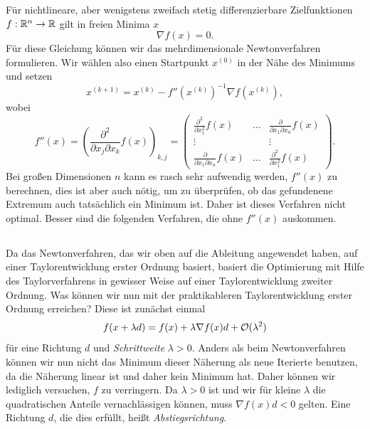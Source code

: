 Für nichtlineare, aber wenigstens zweifach stetig differenzierbare
Zielfunktionen $f:\mathbb{R}^n\to \mathbb{R}$ gilt in freien Minima $x$
\begin{equation}
  \nabla f(x) = 0.
\end{equation}
Für diese Gleichung können wir das mehrdimensionale Newtonverfahren
formulieren. Wir wählen also einen Startpunkt $x^{(0)}$ in der Nähe
des Minimums und setzen
\begin{equation}
  x^{(k+1)} = x^{(k)} - f''\left(x^{(k)}\right)^{-1}\nabla f\left(x^{(k)}\right),
\end{equation}
wobei
\begin{equation}
  f''(x) = 
  \left(\frac{\partial^2}{\partial x_j\partial x_k}f(x)\right)_{k,j} = 
  \begin{pmatrix}
    \frac{\partial^2}{\partial x_1^2}f(x) & \ldots &
    \frac{\partial}{\partial x_1\partial x_n}f(x)\\
    \vdots               &        & \vdots \\
    \frac{\partial}{\partial x_1\partial x_n}f(x) & \ldots &
    \frac{\partial^2}{\partial x_1^2}f(x)
  \end{pmatrix}.
\end{equation}
Bei großen Dimensionen $n$ kann es rasch sehr aufwendig werden,
$f''(x)$ zu berechnen, dies ist aber auch nötig, um zu überprüfen,
ob das gefundenene Extremum auch tatsächlich ein Minimum ist. Daher
ist dieses Verfahren nicht optimal. Besser sind die folgenden
Verfahren, die ohne $f''(x)$ auskommen.

\subsection{}

Da das Newtonverfahren, das wir oben auf die Ableitung angewendet
haben, auf einer Taylorentwicklung erster Ordnung
basiert, basiert die Optimierung mit Hilfe des Taylorverfahrens in
gewisser Weise auf einer Taylorentwicklung zweiter Ordnung. Was können
wir nun mit der praktikableren Taylorentwicklung erster Ordnung
erreichen? Diese ist zunächst einmal
\begin{equation}
  \label{eq:steepestdescentexpand}
  f(x + \lambda d) = f(x) + \lambda \nabla f(x)d + \mathcal O(\lambda^2)
\end{equation}
für eine Richtung $d$ und \emph{Schrittweite} $\lambda > 0$.  Anders
als beim Newtonverfahren können wir nun nicht das Minimum dieser
Näherung als neue Iterierte benutzen, da die Näherung linear ist und
daher kein Minimum hat. Daher können wir lediglich versuchen, $f$ zu
verringern. Da $\lambda>0$ ist und wir für kleine $\lambda$ die
quadratischen Anteile vernachlässigen können, muss $\nabla f(x)d < 0$
gelten. Eine Richtung $d$, die dies erfüllt, heißt
\emph{Abstiegsrichtung}.


